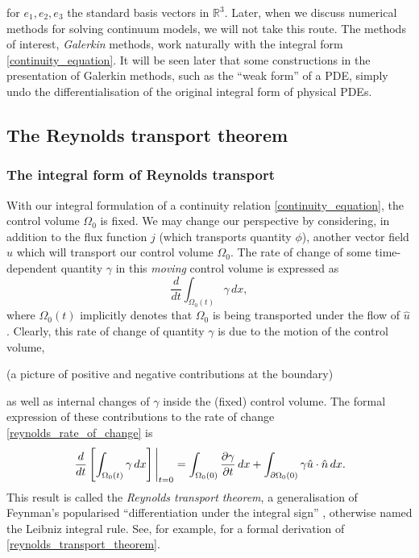 \documentclass[11pt,a4paper]{memoir}
\newcommand{\Part}[2]{\frac{\partial #1}{\partial #2}}
\begin{document}
for $e_1,e_2,e_3$ the standard basis vectors in $\mathbb{R}^3$.
Later, when we discuss numerical methods for solving continuum models, we will not take this route. The methods of interest, \textit{Galerkin} methods,
work naturally with the integral form \eqref{continuity_equation}.
It will be seen later that some constructions in the presentation of Galerkin methods, such as the ``weak form'' of a PDE, simply undo the differentialisation of the original integral form of physical PDEs.

\subsection{The Reynolds transport theorem}
\subsubsection{The integral form of Reynolds transport}
With our integral formulation of a continuity relation \eqref{continuity_equation}, the control volume $\Omega_0$ is fixed.
We may change our perspective by considering, in addition to the flux function $j$ (which transports quantity $\phi$), another
vector field $\hat{u}$ which will transport our control volume $\Omega_0$. The rate of change of some time-dependent quantity $\gamma$ in this
\textit{moving} control volume is expressed as
\begin{equation}\label{reynolds_rate_of_change}
    \frac{d}{dt}\int_{\Omega_0(t)}\gamma\,dx,
\end{equation}
where $\Omega_0(t)$ implicitly denotes that $\Omega_0$ is being transported under the flow of $\hat{u}$.
Clearly, this rate of change of quantity $\gamma$ is due to the motion of the control volume,

\vskip 0.2in
(a picture of positive and negative contributions at the boundary)
\vskip 0.2in

as well as internal changes of $\gamma$ inside the (fixed) control volume.
The formal expression of these contributions to the rate of change \eqref{reynolds_rate_of_change} is
\begin{equation}\label{reynolds_transport_theorem}
    \eval{\frac{d}{dt}\left[\int_{\Omega_0(t)}\gamma\,dx\right]}_{t=0} =
        \int_{\Omega_0(0)}\Part{\gamma}{t}\,dx + \int_{\partial\Omega_0(0)}\gamma \hat{u}\cdot\hat{n} \,dx.
\end{equation}
This result is called the \textit{Reynolds transport theorem},
a generalisation of Feynman's popularised ``differentiation under the integral sign'' \cite{feynman_trick},
otherwise named the Leibniz integral rule. See, for example, \cite{leal} for a formal derivation of \eqref{reynolds_transport_theorem}.
\end{document}
